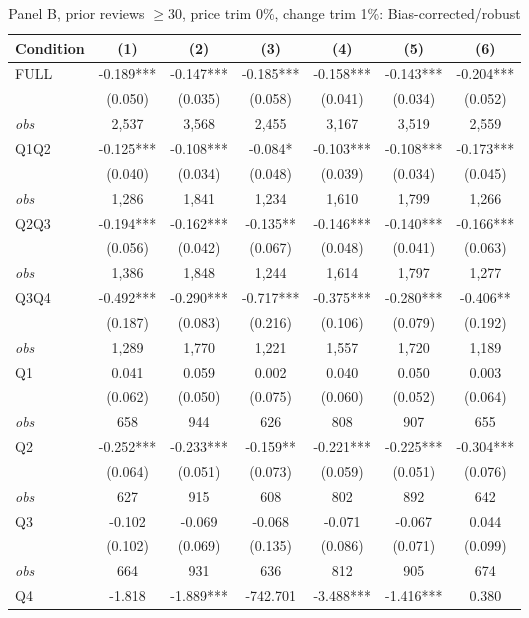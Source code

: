 \begin{table}[!htbp]
\centering
\caption{Panel B, prior reviews $\geq 30$, price trim 0\%, change trim 1\%: Bias-corrected/robust}
\label{tab:b:trim01:reviews30:robust}
\small
\begin{tabular}{lcccccc}
\toprule
Condition & (1) & (2) & (3) & (4) & (5) & (6) \\
\midrule
FULL & -0.189*** & -0.147*** & -0.185*** & -0.158*** & -0.143*** & -0.204*** \\
 & (0.050) & (0.035) & (0.058) & (0.041) & (0.034) & (0.052) \\
\textit{obs} & 2,537 & 3,568 & 2,455 & 3,167 & 3,519 & 2,559 \\
Q1Q2 & -0.125*** & -0.108*** & -0.084* & -0.103*** & -0.108*** & -0.173*** \\
 & (0.040) & (0.034) & (0.048) & (0.039) & (0.034) & (0.045) \\
\textit{obs} & 1,286 & 1,841 & 1,234 & 1,610 & 1,799 & 1,266 \\
Q2Q3 & -0.194*** & -0.162*** & -0.135** & -0.146*** & -0.140*** & -0.166*** \\
 & (0.056) & (0.042) & (0.067) & (0.048) & (0.041) & (0.063) \\
\textit{obs} & 1,386 & 1,848 & 1,244 & 1,614 & 1,797 & 1,277 \\
Q3Q4 & -0.492*** & -0.290*** & -0.717*** & -0.375*** & -0.280*** & -0.406** \\
 & (0.187) & (0.083) & (0.216) & (0.106) & (0.079) & (0.192) \\
\textit{obs} & 1,289 & 1,770 & 1,221 & 1,557 & 1,720 & 1,189 \\
Q1 & 0.041 & 0.059 & 0.002 & 0.040 & 0.050 & 0.003 \\
 & (0.062) & (0.050) & (0.075) & (0.060) & (0.052) & (0.064) \\
\textit{obs} & 658 & 944 & 626 & 808 & 907 & 655 \\
Q2 & -0.252*** & -0.233*** & -0.159** & -0.221*** & -0.225*** & -0.304*** \\
 & (0.064) & (0.051) & (0.073) & (0.059) & (0.051) & (0.076) \\
\textit{obs} & 627 & 915 & 608 & 802 & 892 & 642 \\
Q3 & -0.102 & -0.069 & -0.068 & -0.071 & -0.067 & 0.044 \\
 & (0.102) & (0.069) & (0.135) & (0.086) & (0.071) & (0.099) \\
\textit{obs} & 664 & 931 & 636 & 812 & 905 & 674 \\
Q4 & -1.818 & -1.889*** & -742.701 & -3.488*** & -1.416*** & 0.380 \\

\end{tabular}
\end{table}
